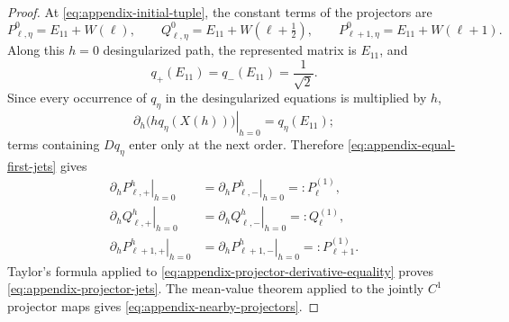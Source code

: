 \documentclass[]{article}
\numberwithin{equation}{section}
\theoremstyle{plain}
\theoremstyle{remark}
\begin{document}
\begin{proof}
At \eqref{eq:appendix-initial-tuple}, the constant terms of the
projectors are
\[
 P^0_{\ell,\eta}=E_{11}+W(\ell),
 \qquad
 Q^0_{\ell,\eta}=E_{11}+W(\ell+\tfrac12),
 \qquad
 P^0_{\ell+1,\eta}=E_{11}+W(\ell+1).
\]
Along this $h=0$ desingularized path, the represented matrix is
\(E_{11}\), and
\begin{equation}\label{eq:appendix-equal-first-jets}
 q_+(E_{11})=q_-(E_{11})=\frac1{\sqrt2}.
\end{equation}
Since every occurrence of \(q_\eta\) in the desingularized equations
is multiplied by \(h\),
\[
 \left.\partial_h\bigl(hq_\eta(X(h))\bigr)\right|_{h=0}
 =q_\eta(E_{11});
\]
terms containing $Dq_\eta$ enter only at the next order.  Therefore
\eqref{eq:appendix-equal-first-jets} gives
\begin{equation}\label{eq:appendix-projector-derivative-equality}
\begin{aligned}
 \left.\partial_hP^h_{\ell,+}\right|_{h=0}
 &=\left.\partial_hP^h_{\ell,-}\right|_{h=0}
 =:P^{(1)}_\ell,\\
 \left.\partial_hQ^h_{\ell,+}\right|_{h=0}
 &=\left.\partial_hQ^h_{\ell,-}\right|_{h=0}
 =:Q^{(1)}_\ell,\\
 \left.\partial_hP^h_{\ell+1,+}\right|_{h=0}
 &=\left.\partial_hP^h_{\ell+1,-}\right|_{h=0}
 =:P^{(1)}_{\ell+1}.
\end{aligned}
\end{equation}
Taylor's formula applied to
\eqref{eq:appendix-projector-derivative-equality} proves
\eqref{eq:appendix-projector-jets}.  The mean-value theorem applied to
the jointly \(C^1\) projector maps gives
\eqref{eq:appendix-nearby-projectors}.
\end{proof}



\end{document}
